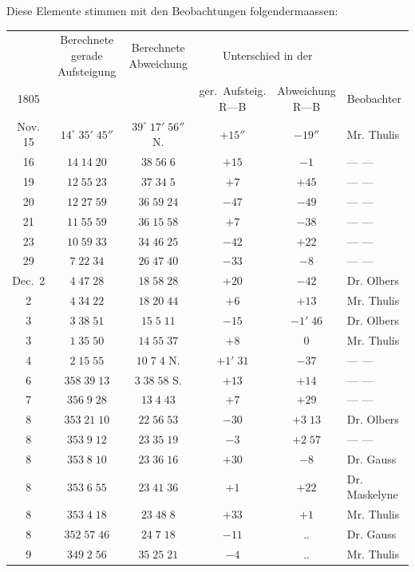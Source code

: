 \par\indent Diese Elemente stimmen mit den Beobachtungen folgendermaassen:

\begin{center}\begingroup
\fontsize{9}{11}\selectfont
\setlength{\tabcolsep}{2pt}\renewcommand{\arraystretch}{1.12}
\begin{tabular}{c|cc|cc|l}
& \shortstack{Berechnete gerade\\Aufsteigung} & \shortstack{Berechnete\\Abweichung} & \multicolumn{2}{c|}{Unterschied in der} & \\
1805 & & & \shortstack{ger.\ Aufsteig.\\R---B} & \shortstack{Abweichung\\R---B} & Beobachter \\
\hline
Nov. 15 & $14^\circ\;35'\;45''$ & $39^\circ\;17'\;56''$ N. & $+15''$ & $-19''$ & Mr. Thulis \\
16 & $14\;14\;20$ & $38\;56\;6$ & $+15$ & $-1$ & --- --- \\
19 & $12\;55\;23$ & $37\;34\;5$ & $+7$ & $+45$ & --- --- \\
20 & $12\;27\;59$ & $36\;59\;24$ & $-47$ & $-49$ & --- --- \\
21 & $11\;55\;59$ & $36\;15\;58$ & $+7$ & $-38$ & --- --- \\
23 & $10\;59\;33$ & $34\;46\;25$ & $-42$ & $+22$ & --- --- \\
29 & $7\;22\;34$ & $26\;47\;40$ & $-33$ & $-8$ & --- --- \\
Dec.\ 2 & $4\;47\;28$ & $18\;58\;28$ & $+20$ & $-42$ & Dr. Olbers \\
2 & $4\;34\;22$ & $18\;20\;44$ & $+6$ & $+13$ & Mr. Thulis \\
3 & $3\;38\;51$ & $15\;5\;11$ & $-15$ & $-1'\;46$ & Dr. Olbers \\
3 & $1\;35\;50$ & $14\;55\;37$ & $+8$ & $0$ & Mr. Thulis \\
4 & $2\;15\;55$ & $10\;7\;4$ N. & $+1'\;31$ & $-37$ & --- --- \\
6 & $358\;39\;13$ & $3\;38\;58$ S. & $+13$ & $+14$ & --- --- \\
7 & $356\;9\;28$ & $13\;4\;43$ & $+7$ & $+29$ & --- --- \\
8 & $353\;21\;10$ & $22\;56\;53$ & $-30$ & $+3\;13$ & Dr. Olbers \\
8 & $353\;9\;12$ & $23\;35\;19$ & $-3$ & $+2\;57$ & --- --- \\
8 & $353\;8\;10$ & $23\;36\;16$ & $+30$ & $-8$ & Dr. Gauss \\
8 & $353\;6\;55$ & $23\;41\;36$ & $+1$ & $+22$ & Dr. Maskelyne \\
8 & $353\;4\;18$ & $23\;48\;8$ & $+33$ & $+1$ & Mr. Thulis \\
8 & $352\;57\;46$ & $24\;7\;18$ & $-11$ & .\quad . & Dr. Gauss \\
9 & $349\;2\;56$ & $35\;25\;21$ & $-4$ & .\quad . & Mr. Thulis \\
\end{tabular}\endgroup\end{center}
